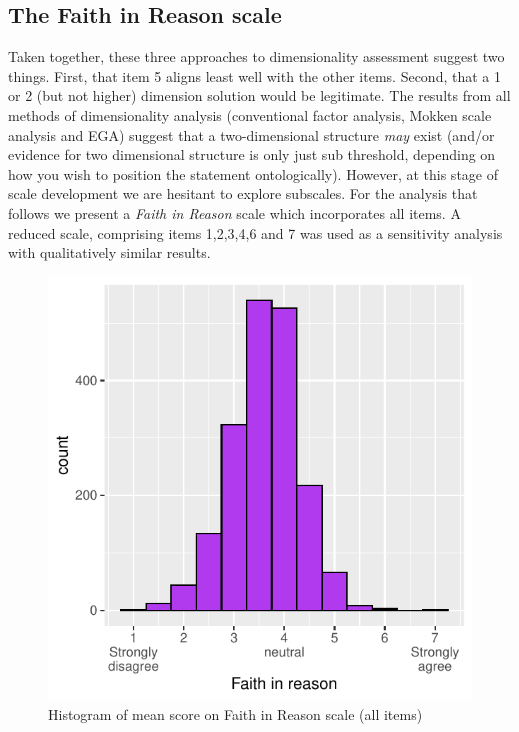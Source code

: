 \documentclass[
  ,jou,floatsintext]{apa6}
\begin{document}
\hypertarget{the-faith-in-reason-scale}{%
\subsection{The Faith in Reason scale}\label{the-faith-in-reason-scale}}

Taken together, these three approaches to dimensionality assessment suggest two things. First, that item 5 aligns least well with the other items. Second, that a 1 or 2 (but not higher) dimension solution would be legitimate. The results from all methods of dimensionality analysis (conventional factor analysis, Mokken scale analysis and EGA) suggest that a two-dimensional structure \emph{may} exist (and/or evidence for two dimensional structure is only just sub threshold, depending on how you wish to position the statement ontologically). However, at this stage of scale development we are hesitant to explore subscales. For the analysis that follows we present a \emph{Faith in Reason} scale which incorporates all items. A reduced scale, comprising items 1,2,3,4,6 and 7 was used as a sensitivity analysis with qualitatively similar results.

\begin{figure}

{\centering \includegraphics[width=0.75\linewidth]{faithinreason_files/figure-latex/meanhistogram-1} 

}

\caption{Histogram of mean score on Faith in Reason scale (all items)}\label{fig:meanhistogram}
\end{figure}
\end{document}
